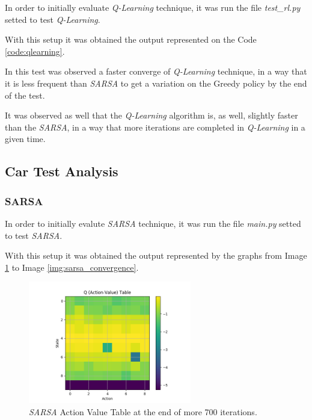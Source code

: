 \documentclass[journal]{IEEEtran}
\begin{document}
In order to initially evaluate \textit{Q-Learning} technique, it was run the file \textit{test\_rl.py} setted to test \textit{Q-Learning}.

With this setup it was obtained the output represented on the Code \ref{code:qlearning}.



In this test was observed a faster converge of \textit{Q-Learning} technique, in a way that it is less frequent than \textit{SARSA} to get a variation on the Greedy policy by the end of the test.

It was observed as well that the \textit{Q-Learning} algorithm is, as well, slightly faster than the \textit{SARSA}, in a way that more iterations are completed in \textit{Q-Learning} in a given time.

\subsection{Car Test Analysis}

\subsubsection{SARSA}
In order to initially evalute \textit{SARSA} technique, it was run the file \textit{main.py} setted to test \textit{SARSA}.

With this setup it was obtained the output represented by the graphs from Image \ref{img:sarsa_action} to Image \ref{img:sarsa_convergence}.

\begin{figure}
  \begin{center}
  \includegraphics[width=2.8in]{./../code/results_sarsa/action_value_table.png}
  \caption{\textit{SARSA} Action Value Table at the end of more 700 iterations.}
  \label{img:sarsa_action}
  \end{center}
\end{figure}
\end{document}
